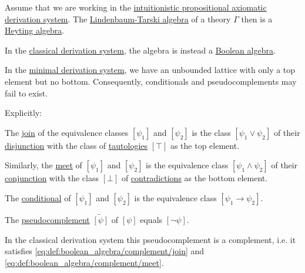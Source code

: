 \begin{proposition}\label{thm:intuitionistic_lindenbaum_tarski_algebra}
  Assume that we are working in the \hyperref[def:intuitionistic_propositional_axiomatic_derivation_system]{intuitionistic propositional axiomatic derivation system}. The \hyperref[def:lindenbaum_tarski_algebra]{Lindenbaum-Tarski algebra} of a theory \( \Gamma \) then is a \hyperref[def:heyting_algebra]{Heyting algebra}.

  In the \hyperref[def:propositional_axiomatic_derivation_system]{classical derivation system}, the algebra is instead a \hyperref[def:boolean_algebra]{Boolean algebra}.

  In the \hyperref[def:minimal_propositional_axiomatic_derivation_system]{minimal derivation system}, we have an unbounded lattice with only a top element but no bottom. Consequently, conditionals and pseudocomplements may fail to exist.

  Explicitly:
  \begin{thmenum}
     The \hyperref[def:semilattice/join]{join} of the equivalence classes \( [\psi_1] \) and \( [\psi_2] \) is the class \( [\psi_1 \vee \psi_2] \) of their \hyperref[def:propositional_language/connectives/disjunction]{disjunction} with the class of \hyperref[def:propositional_semantics/tautology]{tautologies} \( [\top] \) as the top element.

     Similarly, the \hyperref[def:semilattice/meet]{meet} of \( [\psi_1] \) and \( [\psi_2] \) is the equivalence class \( [\psi_1 \wedge \psi_2] \) of their \hyperref[def:propositional_language/connectives/conjunction]{conjunction} with the class \( [\bot] \) of \hyperref[def:propositional_semantics/contradiction]{contradictions} as the bottom element.

     The \hyperref[eq:def:heyting_algebra/conditional]{conditional} of \( [\psi_1] \) and \( [\psi_2] \) is the equivalence class \( [\psi_1 \rightarrow \psi_2] \).

     The \hyperref[eq:def:heyting_algebra/pseudocomplement]{pseudocomplement} \( \widetilde{[\psi]} \) of \( [\psi] \) equals \( [\neg \psi] \).

    In the classical derivation system this pseudocomplement is a complement, i.e. it satisfies \eqref{eq:def:boolean_algebra/complement/join} and \eqref{eq:def:boolean_algebra/complement/meet}.
  \end{thmenum}
\end{proposition}
